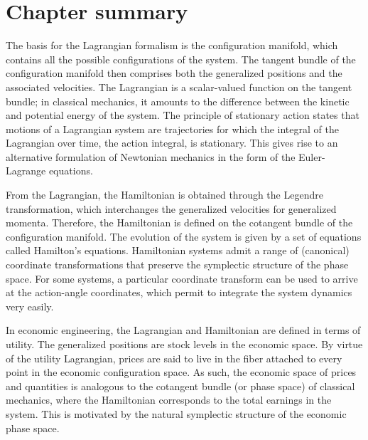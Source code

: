\clearpage
\section*{Chapter summary} 
The basis for the Lagrangian formalism is the configuration manifold, which contains all the possible configurations of the system. The tangent bundle of the configuration manifold then comprises both the generalized positions and the associated velocities. The Lagrangian is a scalar-valued function on the tangent bundle; in classical mechanics, it amounts to the difference between the kinetic and potential energy of the system. The principle of stationary action states that motions of a Lagrangian system are trajectories for which the integral of the Lagrangian over time, the action integral, is stationary. This gives rise to an alternative formulation of Newtonian mechanics in the form of the Euler-Lagrange equations.

From the Lagrangian, the Hamiltonian is obtained through the Legendre transformation, which interchanges the generalized velocities for  generalized momenta. Therefore, the Hamiltonian is defined on the cotangent bundle of the configuration manifold. The evolution of the system is given by a set of equations called Hamilton's equations. Hamiltonian systems admit a range of (canonical) coordinate transformations that preserve the symplectic structure of the phase space. For some systems, a particular coordinate transform can be used to arrive at the action-angle coordinates, which permit to integrate the system dynamics very easily.

In economic engineering, the Lagrangian and Hamiltonian are defined in terms of utility. The generalized positions are stock levels in the economic space. By virtue of the utility Lagrangian, prices are said to live in the fiber attached to every point in the economic configuration space. As such, the economic space of prices and quantities is analogous to the cotangent bundle (or phase space) of classical mechanics, where the Hamiltonian corresponds to the total earnings in the system. This is motivated by the natural symplectic structure of the economic phase space.
